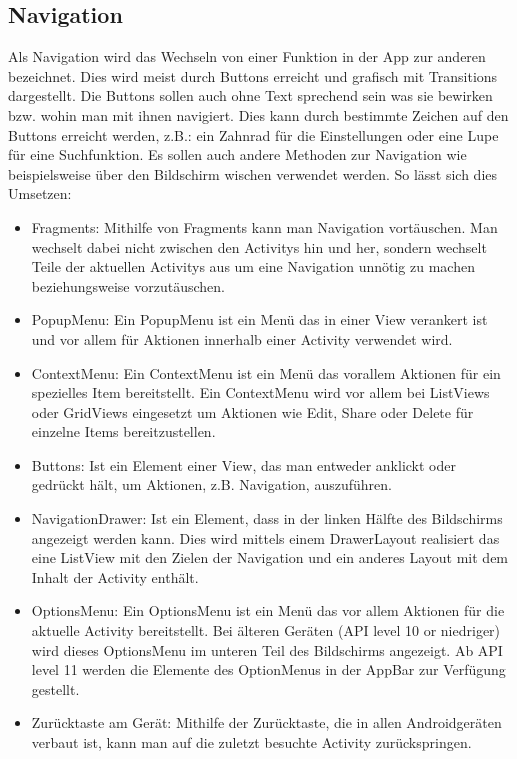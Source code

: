 \documentclass[FIPLY_base.tex]{subfiles}
\begin{document}
\subsection{Navigation}
Als Navigation wird das Wechseln von einer Funktion in der App zur anderen bezeichnet. Dies wird meist durch Buttons erreicht und grafisch mit Transitions dargestellt.
Die Buttons sollen auch ohne Text sprechend sein was sie bewirken bzw. wohin man mit ihnen navigiert. Dies kann durch bestimmte Zeichen auf den Buttons erreicht werden, z.B.: ein Zahnrad für die Einstellungen oder eine Lupe für eine Suchfunktion. Es sollen auch andere Methoden zur Navigation wie beispielsweise über den Bildschirm wischen verwendet werden.
So lässt sich dies Umsetzen:
\begin{itemize}
	\item Fragments: Mithilfe von Fragments kann man Navigation vortäuschen. Man wechselt dabei nicht zwischen den Activitys hin und her, sondern wechselt Teile der aktuellen Activitys aus um eine Navigation unnötig zu machen beziehungsweise vorzutäuschen.
	\item PopupMenu: Ein PopupMenu ist ein Menü das in einer View verankert ist und vor allem für Aktionen innerhalb einer Activity verwendet wird.
	\item ContextMenu: Ein ContextMenu ist ein Menü das vorallem Aktionen für ein spezielles Item bereitstellt. Ein ContextMenu wird vor allem bei ListViews oder GridViews eingesetzt um Aktionen wie Edit, Share 
	oder Delete für einzelne Items bereitzustellen.
	\item Buttons: Ist ein Element einer View, das man entweder anklickt oder gedrückt hält, um Aktionen, z.B. Navigation, auszuführen.
	\item NavigationDrawer: Ist ein Element, dass in der linken Hälfte des Bildschirms angezeigt werden kann. Dies wird mittels einem DrawerLayout realisiert das eine ListView mit den Zielen der Navigation und ein anderes Layout mit dem Inhalt der Activity enthält.
	\item OptionsMenu: Ein OptionsMenu ist ein Menü das vor allem Aktionen für die aktuelle Activity bereitstellt. 
	Bei älteren Geräten (API level 10 or niedriger) wird dieses OptionsMenu im unteren Teil des Bildschirms angezeigt.
	Ab API level 11 werden die Elemente des OptionMenus in der 
	AppBar zur Verfügung gestellt.
	\item Zurücktaste am Gerät: Mithilfe der Zurücktaste, die in allen Androidgeräten verbaut ist, kann man auf die zuletzt besuchte Activity zurückspringen.
\end{itemize}
\end{document}
